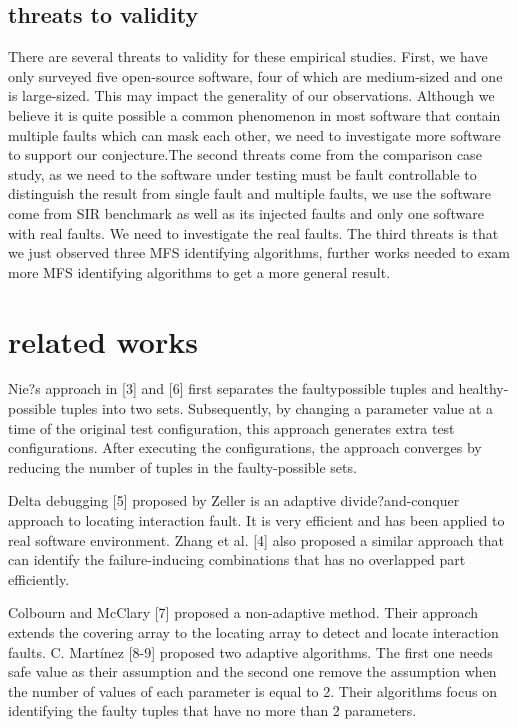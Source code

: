 \documentclass{sig-alternate}
\begin{document}
\subsection{threats to validity}
There are several threats to validity for these empirical studies. First, we have only surveyed five open-source software, four of which are medium-sized and one is large-sized. This may impact the generality of our observations. Although we believe it is quite possible a common phenomenon in most software that contain multiple faults which can mask each other, we need to investigate more software to support our conjecture.The second threats come from the comparison case study, as we need to the software under testing must be fault controllable to distinguish the result from single fault and multiple faults, we use the software come from SIR benchmark as well as its injected faults and only one software with real faults. We need to investigate the real faults. The third threats is that we just observed three MFS identifying algorithms, further works needed to exam more MFS identifying algorithms to get a more general result.

\section{related works}

Nie?s approach in [3] and [6] first separates the faultypossible tuples and healthy-possible tuples into two sets. Subsequently, by changing a parameter value at a time of the original test configuration, this approach generates extra test configurations. After executing the configurations, the approach converges by reducing the number of tuples in the faulty-possible sets.

Delta debugging [5] proposed by Zeller is an adaptive divide?and-conquer approach to locating interaction fault. It is very efficient and has been applied to real software environment. Zhang et al. [4] also proposed a similar approach that can identify the failure-inducing combinations that has no overlapped part efficiently.

Colbourn and McClary [7] proposed a non-adaptive method. Their approach extends the covering array to the locating array to detect and locate interaction faults. C. Martínez [8-9] proposed two adaptive algorithms. The first one needs safe value as their assumption and the second one remove the assumption when the number of values of each parameter is equal to 2. Their algorithms focus on identifying the faulty tuples that have no more than 2 parameters.  
\end{document}
